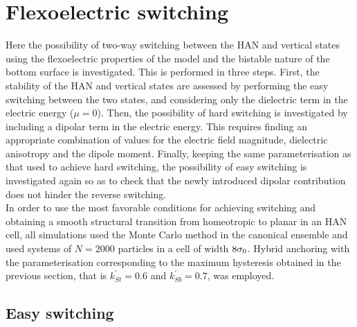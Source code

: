 

\section{Flexoelectric switching}

Here the possibility of two-way switching between the HAN and vertical states using the
flexoelectric properties of the model and the bistable nature
of the bottom surface is investigated. This is performed in three steps. First, the
stability of the HAN and vertical states are assessed by performing the easy switching
between the two states, and considering only the dielectric term in the electric energy 
(\ie $\mu=0$). Then, the possibility of hard switching is investigated by including a
dipolar term in the electric energy. This requires finding an
appropriate combination of values for the electric field magnitude, dielectric anisotropy and the 
dipole moment. Finally, keeping the same parameterisation as that used to achieve hard switching, 
the possibility of easy switching is investigated again so as to check that the newly introduced 
dipolar contribution does not hinder the reverse switching.\\
In order to use the most favorable conditions for achieving switching and obtaining a smooth
structural transition from homeotropic to planar in an HAN cell, all simulations used the Monte
Carlo method in the canonical ensemble and 
used systems of $N=2000$  particles in a cell of width $8\sigma_0$. Hybrid anchoring with the
parameterisation  corresponding to the maximum hysteresis obtained in the previous section, 
that is $k^\prime_{St} = 0.6$ and $k^\prime_{Sb} = 0.7$, was employed.

\subsection{Easy switching}
\label{ss:easySwitch}

